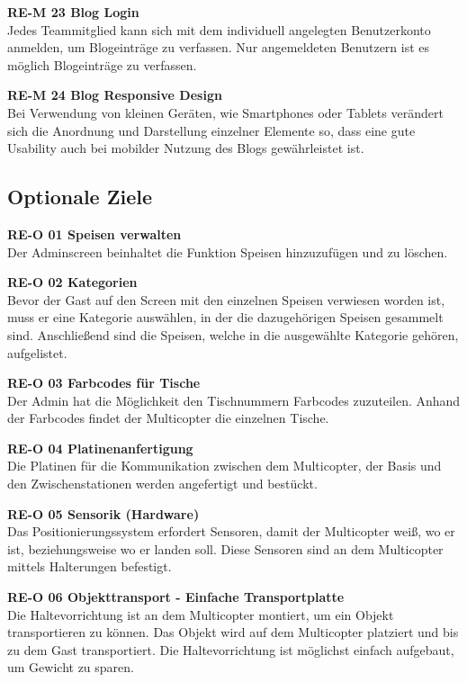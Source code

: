   \textbf{RE-M 23 Blog Login}\\
  Jedes Teammitglied kann sich mit dem individuell angelegten Benutzerkonto anmelden,
  um Blogeinträge zu verfassen. Nur angemeldeten Benutzern ist es möglich Blogeinträge zu
  verfassen.

  \textbf{RE-M 24 Blog Responsive Design}\\
  Bei Verwendung von kleinen Geräten, wie Smartphones oder Tablets verändert sich die
  Anordnung und Darstellung einzelner Elemente so, dass eine gute Usability auch bei mobilder
  Nutzung des Blogs gewährleistet ist.

  \subsection{Optionale Ziele}
  \textbf{RE-O 01 Speisen verwalten}\\
  Der Adminscreen beinhaltet die Funktion Speisen hinzuzufügen und zu löschen.

  \textbf{RE-O 02 Kategorien}\\
  Bevor der Gast auf den Screen mit den einzelnen Speisen verwiesen worden ist, muss er
  eine Kategorie auswählen, in der die dazugehörigen Speisen gesammelt sind. Anschließend
  sind die Speisen, welche in die ausgewählte Kategorie gehören, aufgelistet.

  \textbf{RE-O 03 Farbcodes für Tische}\\
  Der Admin hat die Möglichkeit den Tischnummern Farbcodes zuzuteilen. Anhand der
  Farbcodes findet der Multicopter die einzelnen Tische.

  \textbf{RE-O 04 Platinenanfertigung}\\
  Die Platinen für die Kommunikation zwischen dem Multicopter, der
  Basis und den Zwischenstationen werden angefertigt und bestückt.

  \textbf{RE-O 05 Sensorik (Hardware)}\\
  Das Positionierungssystem erfordert Sensoren, damit der Multicopter weiß, wo er
  ist, beziehungsweise wo er landen soll. Diese Sensoren sind an dem Multicopter
  mittels Halterungen befestigt.

  \textbf{RE-O 06 Objekttransport - Einfache Transportplatte}\\
  Die Haltevorrichtung ist an dem Multicopter montiert, um ein Objekt transportieren zu können.
  Das Objekt wird auf dem Multicopter platziert und bis zu dem Gast transportiert.
  Die Haltevorrichtung ist möglichst einfach aufgebaut, um Gewicht zu sparen.


